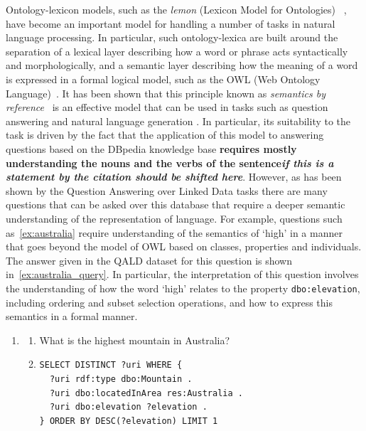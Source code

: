 \documentclass[11pt]{article}
\begin{document}
Ontology-lexicon models, such as the \emph{lemon} (Lexicon Model for Ontologies)~
\cite{mccrae2012interchanging}, have become an important model for handling a 
number of tasks in natural language processing. In particular, such 
ontology-lexica are built around the separation of a lexical layer describing 
how a word or phrase acts syntactically and morphologically, and a semantic layer 
describing how the meaning of a word is expressed in a formal logical model, 
such as the OWL (Web Ontology Language)~\cite{mcguinness2004owl}. It has been 
shown that this principle known as \emph{semantics by reference}~
\cite{buitelaar2010ontology} is an effective model that can be used in tasks 
such as question answering \cite{unger2011pythia} and natural language 
generation \cite{cimiano2013exploiting}. In particular, its suitability to the 
task is driven by the fact that the application of this model to answering questions 
based on the DBpedia \cite{auer2007dbpedia} knowledge base \textbf{requires mostly 
understanding the nouns and the verbs of the sentence\textit{if this is a statement by \cite{auer2007dbpedia} the citation should be shifted here}}. However, as has been 
shown by the Question Answering over Linked Data \cite[QALD]{lopez2013evaluating}
tasks there are many questions that can be asked over this database that require 
a deeper semantic understanding of the representation of language. For example, 
questions such as~\ref{ex:australia} require understanding of the semantics of `high' in a manner that goes beyond 
the model of OWL based on classes, properties and individuals. The answer given 
in the QALD dataset for this question is shown in~\ref{ex:australia_query}. 
In particular, the interpretation of this question involves the understanding of 
how the word `high' relates to the property {\tt dbo:elevation}, including ordering 
and subset selection operations, and how to express this semantics in a formal manner.

\begin{enumerate}
\item \begin{enumerate} 
\item What is the highest mountain in Australia? \label{ex:australia}
\item \begin{verbatim}
SELECT DISTINCT ?uri WHERE { 
  ?uri rdf:type dbo:Mountain . 
  ?uri dbo:locatedInArea res:Australia . 
  ?uri dbo:elevation ?elevation . 
} ORDER BY DESC(?elevation) LIMIT 1
\end{verbatim} 
\label{ex:australia_query}
\end{enumerate}
\end{enumerate}
\end{document}
